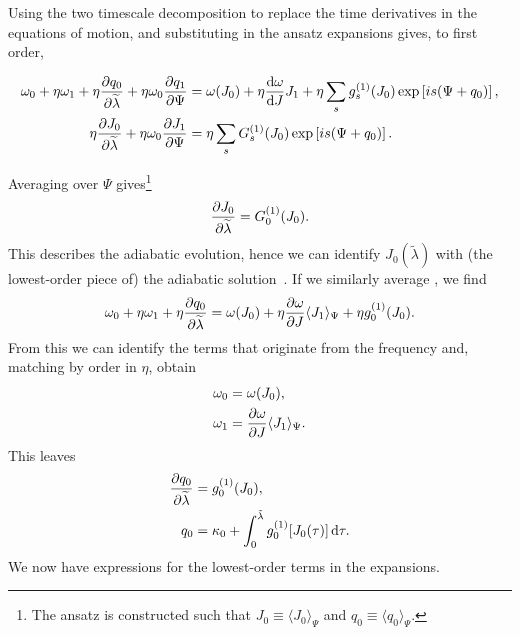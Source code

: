 Using the two timescale decomposition to replace the time derivatives in the equations of motion, and substituting in the ansatz expansions gives, to first order,
\begin{widetext}
\begin{subequations}
\begin{align}
\label{eq:q-1}
\omega_0 + \eta\omega_1 + \eta\dfrac{\partial {q_0}}{\partial {\widetilde{\lambda}}} + \eta\omega_0\dfrac{\partial {q_1}}{\partial {\Psi}} = {} & \omega(J_0) + \eta\dfrac{\mathrm{d} {\omega}}{\mathrm{d} {J}}J_1 + \eta \sum_s g_s^{(1)}(J_0)\exp\left[is(\Psi + q_0)\right], \\
\eta\dfrac{\partial {J_0}}{\partial {\widetilde{\lambda}}} + \eta\omega_0\dfrac{\partial {J_1}}{\partial {\Psi}} = {} & \eta \sum_s G_s^{(1)}(J_0)\exp\left[is(\Psi + q_0)\right].
\label{eq:J-1}
\end{align}
\end{subequations}
\end{widetext}
Averaging  over $\Psi$ gives\footnote{The ansatz is constructed such that $J_0 \equiv \langle J_0\rangle_\Psi$ and $q_0 \equiv \langle q_0\rangle_\Psi$.}
\begin{equation}
\dfrac{\partial {J_0}}{\partial {\widetilde{\lambda}}} = G_0^{(1)}(J_0).
\label{eq:J-ad}
\end{equation}
This describes the adiabatic evolution, hence we can identify $J_0\left(\widetilde{\lambda}\right)$ with (the lowest-order piece of) the adiabatic solution~\cite{Hinderer2008}. If we similarly average , we find
\begin{equation}
\omega_0 + \eta\omega_1 +\eta\dfrac{\partial {q_0}}{\partial {\widetilde{\lambda}}} = \omega(J_0) + \eta\dfrac{\partial {\omega}}{\partial {J}}\langle J_1\rangle_\Psi + \eta g_0^{(1)}(J_0).
\end{equation}
From this we can identify the terms that originate from the frequency and, matching by order in $\eta$, obtain
\begin{subequations}
\begin{align}
\omega_0 = {} & \omega(J_0), \\
\omega_1 = {} & \dfrac{\partial {\omega}}{\partial {J}}\langle J_1\rangle_\Psi.
\end{align}
\end{subequations}
This leaves
\begin{align}
\dfrac{\partial {q_0}}{\partial {\widetilde{\lambda}}} = {} & g_0^{(1)}(J_0), \\
q_0 = {} & \kappa_0 + \int_{0}^{\tilde{\lambda}}{g_0^{(1)}[J_0(\tau)]}\,\mathrm{d}{\tau}.
\label{eq:q-0-sol}
\end{align}
We now have expressions for the lowest-order terms in the expansions.

